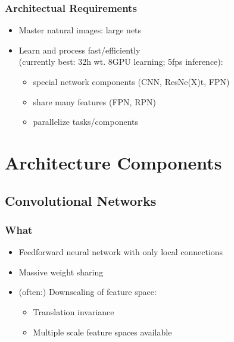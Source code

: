 \begin{frame}[<+->]
  \frametitle{Architectual Requirements}
  \begin{itemize}
  \item Master natural images: large nets
  \item Learn and process fast/efficiently\\
    (currently best: 32h wt. 8GPU learning; 5fps inference):
    \begin{itemize}
    \item special network components
      (CNN, ResNe(X)t, FPN)
    \item share many features (FPN, RPN)
    \item parallelize tasks/components
    \end{itemize}
  \end{itemize}
\end{frame}

\section{Architecture Components}
\subsection{Convolutional Networks}
\begin{frame}[<+->]
  \frametitle{What}
  \begin{itemize}
  \item Feedforward neural network with only local connections
  \item Massive weight sharing
  \item (often:) Downscaling of feature space:
    \begin{itemize}
    \item Translation invariance
    \item Multiple scale feature spaces available
    \end{itemize}
  \end{itemize}
\end{frame}

